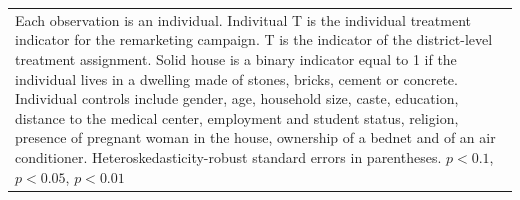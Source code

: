{{\begin{tabular}{l*{5}{c}}
\hline\hline
\multicolumn{6}{p{0.85\linewidth}}{\scriptsize Each observation is an individual. Indivitual T is the individual treatment indicator for the remarketing campaign. T is the indicator of the district-level treatment assignment. Solid house is a binary indicator equal to 1 if the individual lives in a dwelling made of stones, bricks, cement or concrete. Individual controls include gender, age, household size, caste, education, distance to the medical center, employment and student status, religion, presence of pregnant woman in the house, ownership of a bednet and of an air conditioner. Heteroskedasticity-robust standard errors in parentheses. \sym{*} \(p<0.1\), \sym{**} \(p<0.05\), \sym{***} \(p<0.01\)}\\
\end{tabular}
}%

}
